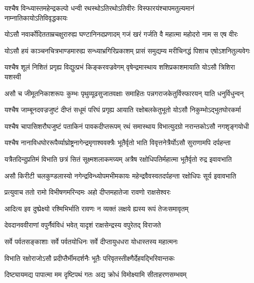 \twolineshloka
{यश्चैष विन्ध्यास्तमहेन्द्रकल्पो धन्वी रथस्थोऽतिरथोऽतिवीरः}
{विस्फारयंश्चापमतुल्यमानं नाम्नातिकायोऽतिविवृद्धकायः} %

\twolineshloka
{योऽसौ नवार्कोदितताम्रचक्षुरारुह्य घण्टानिनदप्रणादम्}
{गजं खरं गर्जति वै महात्मा महोदरो नाम स एष वीरः} %

\twolineshloka
{योऽसौ हयं काञ्चनचित्रभाण्डमारुह्य सन्ध्याभ्रगिरिप्रकाशम्}
{प्रासं समुद्यम्य मरीचिनद्धं पिशाच एषोऽशनितुल्यवेगः} %

\twolineshloka
{यश्चैष शूलं निशितं प्रगृह्य विद्युत्प्रभं किङ्करवज्रवेगम्}
{वृषेन्द्रमास्थाय शशिप्रकाशमायाति योऽसौ त्रिशिरा यशस्वी} %

\twolineshloka
{असौ च जीमूतनिकाशरूपः कुम्भः पृथुव्यूढसुजातवक्षाः}
{समाहितः पन्नगराजकेतुर्विस्फारयन् याति धनुर्विधुन्वन्} %

\twolineshloka
{यश्चैष जाम्बूनदवज्रजुष्टं दीप्तं सधूमं परिघं प्रगृह्य}
{आयाति रक्षोबलकेतुभूतो योऽसौ निकुम्भोऽद्भुतघोरकर्मा} %

\twolineshloka
{यश्चैष चापासिशरौघजुष्टं पताकिनं पावकदीप्तरूपम्}
{रथं समास्थाय विभात्युदग्रो नरान्तकोऽसौ नगशृङ्गयोधी} %

\twolineshloka
{यश्चैष नानाविधघोररूपैर्व्याघ्रोष्ट्रनागेन्द्रमृगाश्ववक्त्रैः}
{भूतैर्वृतो भाति विवृत्तनेत्रैर्योऽसौ सुराणामपि दर्पहन्ता} %

\twolineshloka
{यत्रैतदिन्दुप्रतिमं विभाति छत्रं सितं सूक्ष्मशलाकमग्र्यम्}
{अत्रैष रक्षोधिपतिर्महात्मा भूतैर्वृतो रुद्र इवावभाति} %

\twolineshloka
{असौ किरीटी चलकुण्डलास्यो नगेन्द्रविन्ध्योपमभीमकायः}
{महेन्द्रवैवस्वतदर्पहन्ता रक्षोधिपः सूर्य इवावभाति} %

\twolineshloka
{प्रत्युवाच ततो रामो विभीषणमरिन्दमः}
{अहो दीप्तमहातेजा रावणो राक्षसेश्वरः} %

\twolineshloka
{आदित्य इव दुष्प्रेक्ष्यो रश्मिभिर्भाति रावणः}
{न व्यक्तं लक्षये ह्यस्य रूपं तेजःसमावृतम्} %

\twolineshloka
{देवदानववीराणां वपुर्नैवंविधं भवेत्}
{यादृशं राक्षसेन्द्रस्य वपुरेतद् विराजते} %

\twolineshloka
{सर्वे पर्वतसङ्काशाः सर्वे पर्वतयोधिनः}
{सर्वे दीप्तायुधधरा योधास्तस्य महात्मनः} %

\twolineshloka
{विभाति रक्षोराजोऽसौ प्रदीप्तैर्भीमदर्शनैः}
{भूतैः परिवृतस्तीक्ष्णैर्देहवद्भिरिवान्तकः} %

\twolineshloka
{दिष्ट्यायमद्य पापात्मा मम दृष्टिपथं गतः}
{अद्य क्रोधं विमोक्ष्यामि सीताहरणसम्भवम्} %

